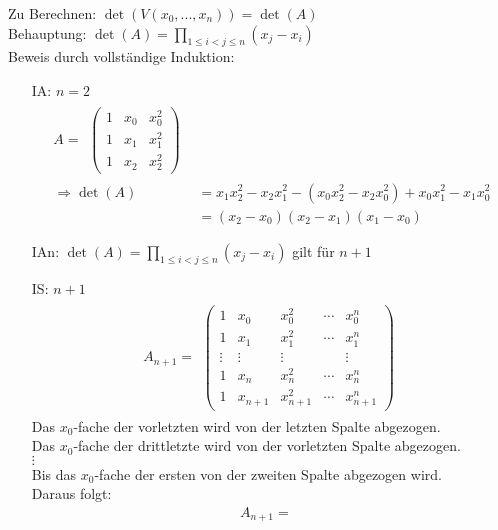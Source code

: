 Zu Berechnen: $\det(V(x_0,...,x_n))=\det(A)$\\
Behauptung: $\det(A) = \prod \limits_{1 \leq i < j \leq n}(x_j-x_i)$\\
Beweis durch vollständige Induktion:\\
\begin{itemize}
	\item[IA:] $n=2$\\
	\begin{align*}
	A =
	\begin{split}
	\begin{pmatrix}
	1 & x_0 & x_0^2 \\
	1 & x_1 & x_1^2 \\
	1 & x_2 & x_2^2 
	\end{pmatrix}
	\end{split}\\
	\Rightarrow \det(A) &= x_1x_2^2-x_2x_1^2-(x_0x_2^2-x_2x_0^2)+x_0x_1^2-x_1x_0^2\\
	&= (x_2-x_0)(x_2-x_1)(x_1-x_0)
	\end{align*}
	\item[IAn:] $\det(A)=\prod \limits_{1 \leq i < j \leq n}(x_j-x_i)$ gilt für $n+1$
	\item[IS:] $n+1$\\
	\begin{align*}
	A_{n+1}=
	\begin{split}
	\begin{pmatrix}
	1 & x_0 & x_0^2 & \cdots & x_0^{n} \\
	1 & x_1 & x_1^2 & \cdots & x_1^{n} \\
	\vdots & \vdots & \vdots &  & \vdots \\
	1 & x_n & x_n^2 & \cdots & x_n^{n}\\
	1 & x_{n+1} & x_{n+1}^2 & \cdots & x_{n+1}^{n}
	\end{pmatrix}
	\end{split}
	\end{align*}
	Das $x_0$-fache der vorletzten wird von der letzten Spalte abgezogen.\\
	Das $x_0$-fache der drittletzte wird von der vorletzten Spalte abgezogen.\\
	$\vdots$\\
	Bis das $x_0$-fache der ersten von der zweiten Spalte abgezogen wird.\\
	Daraus folgt:\\
	\begin{align*}
	A_{n+1}=
	\begin{split}

\end{split}
\end{align*}
\end{itemize}
